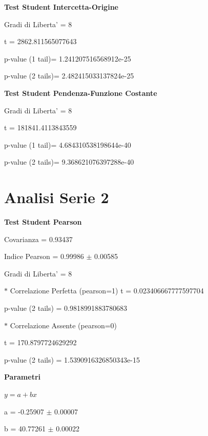 \documentclass{article}
\begin{document}
\textbf{Test Student Intercetta-Origine}

Gradi di Liberta' = 8

t = 2862.811565077643

p-value (1 tail)= 1.241207516568912e-25

p-value (2 tails)= 2.482415033137824e-25

\textbf{Test Student Pendenza-Funzione Costante}

Gradi di Liberta' = 8

t = 181841.4113843559

p-value (1 tail)= 4.684310538198644e-40

p-value (2 tails)= 9.368621076397288e-40

\section*{Analisi Serie 2}

\textbf{Test Student Pearson}

Covarianza = 0.93437

Indice Pearson = 0.99986 $\pm$ 0.00585

Gradi di Liberta' = 8

$\ast$ Correlazione Perfetta (pearson=1)
t = 0.023406667777597704

p-value (2 tails) = 0.9818991883780683

$\ast$ Correlazione Assente (pearson=0)

t = 170.8797724629292

p-value (2 tails) = 1.5390916326850343e-15

\textbf{Parametri}

$y = a + bx$

a = -0.25907 $\pm$ 0.00007

b = 40.77261 $\pm$ 0.00022
\end{document}
